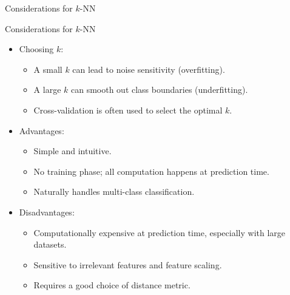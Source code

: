 \documentclass[hyperref={pdfpagelabels=false},aspectratio=169]{beamer}
\begin{document}
\begin{frame}[label={sec:org61b752e}]{Considerations for \(k\)-NN}
\begin{block}{Considerations for \(k\)-NN}
\begin{itemize}[<+->]
\item \alert{Choosing \(k\)}:
\begin{itemize}
\item A small \(k\) can lead to noise sensitivity (overfitting).
\item A large \(k\) can smooth out class boundaries (underfitting).
\item Cross-validation is often used to select the optimal \(k\).
\end{itemize}
\item \alert{Advantages}:
\begin{itemize}
\item Simple and intuitive.
\item No training phase; all computation happens at prediction time.
\item Naturally handles multi-class classification.
\end{itemize}
\item \alert{Disadvantages}:
\begin{itemize}
\item Computationally expensive at prediction time, especially with large datasets.
\item Sensitive to irrelevant features and feature scaling.
\item Requires a good choice of distance metric.
\end{itemize}
\end{itemize}
\end{block}
\end{frame}
\end{document}
